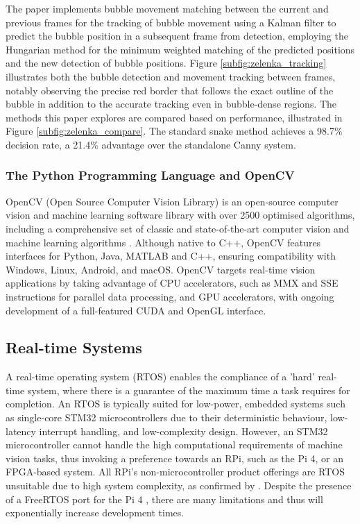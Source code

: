 The paper implements bubble movement matching between the current and previous frames for the tracking of bubble movement using a Kalman filter \cite{kalmanNewApproachLinear1960} to predict the bubble position in a subsequent frame from detection, employing the Hungarian method \cite{kuhnHungarianMethodAssignment1955} for the minimum weighted matching of the predicted positions and the new detection of bubble positions. Figure \ref{subfig:zelenka_tracking} illustrates both the bubble detection and movement tracking between frames, notably observing the precise red border that follows the exact outline of the bubble in addition to the accurate tracking even in bubble-dense regions. The methods this paper explores are compared based on performance, illustrated in Figure \ref{subfig:zelenka_compare}. The standard snake method achieves a 98.7\% decision rate, a 21.4\% advantage over the standalone Canny system.

\subsubsection{The Python Programming Language and OpenCV}
OpenCV (Open Source Computer Vision Library) is an open-source computer vision and machine learning software library with over 2500 optimised algorithms, including a comprehensive set of classic and state-of-the-art computer vision and machine learning algorithms \cite{opencv}. Although native to C++, OpenCV features interfaces for Python, Java, MATLAB and C++, ensuring compatibility with Windows, Linux, Android, and macOS. OpenCV targets real-time vision applications by taking advantage of CPU accelerators, such as MMX and SSE instructions for parallel data processing, and GPU accelerators, with ongoing development of a full-featured CUDA and OpenGL interface.

\subsection{Real-time Systems}
A real-time operating system (RTOS) enables the compliance of a 'hard' real-time system, where there is a guarantee of the maximum time a task requires for completion. An RTOS is typically suited for low-power, embedded systems such as single-core STM32 microcontrollers due to their deterministic behaviour, low-latency interrupt handling, and low-complexity design. However, an STM32 microcontroller cannot handle the high computational requirements of machine vision tasks, thus invoking a preference towards an RPi, such as the Pi 4, or an FPGA-based system. All RPi's non-microcontroller product offerings are RTOS unsuitable due to high system complexity, as confirmed by \cite{FreeRTOSRaspberry2022}. Despite the presence of a FreeRTOS port for the Pi 4 \cite{timadaTImadaRaspi4_freertos2024}, there are many limitations and thus will exponentially increase development times.

